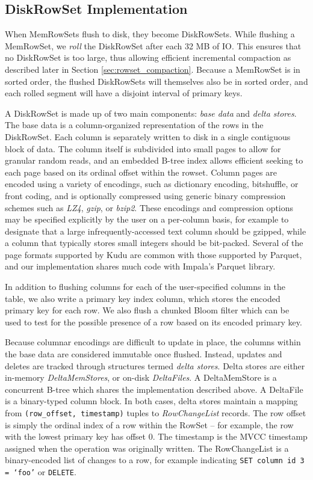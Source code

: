 \documentclass{vldb}
\begin{document}
\subsection{DiskRowSet Implementation}

When MemRowSets flush to disk, they become DiskRowSets. While flushing a
MemRowSet, we {\em roll} the DiskRowSet after each 32 MB of IO. This ensures
that no DiskRowSet is too large, thus allowing efficient incremental compaction
as described later in Section \ref{sec:rowset_compaction}. Because a MemRowSet
is in sorted order, the flushed DiskRowSets will themselves also be in
sorted order, and each rolled segment will have a disjoint interval
of primary keys.

A DiskRowSet is made up of two main components: {\em base data} and {\em delta stores}. The base
data is a column-organized representation of the rows in the DiskRowSet. Each column is separately
written to disk in a single contiguous block of data. The column itself is subdivided into small
pages to allow for granular random reads, and an embedded B-tree index allows efficient seeking to
each page based on its ordinal offset within the rowset. Column pages are encoded using a variety of
encodings, such as dictionary encoding, bitshuffle\cite{bitshuffle}, or front coding, and is optionally
compressed using generic binary compression schemes such as {\em LZ4},
{\em gzip}, or {\em bzip2}. These encodings and compression options may be specified
explicitly by the user on a per-column basis, for example to designate that a large
infrequently-accessed text column should be gzipped, while a column that typically stores small
integers should be bit-packed. Several of the page formats supported by Kudu are common
with those supported by Parquet, and our implementation shares much code with Impala's Parquet
library.

In addition to flushing columns for each of the user-specified columns in the table, we also write a
primary key index column, which stores the encoded primary key for each row.  We also flush a
chunked Bloom filter\cite{bloom_filter} which can be used to test for the possible presence of a row based on its
encoded primary key.

Because columnar encodings are difficult to update in place, the columns within the base data
are considered immutable once flushed. Instead, updates and deletes are tracked through
structures termed {\em delta stores}. Delta stores are either in-memory {\em DeltaMemStores},
or on-disk {\em DeltaFiles}. A DeltaMemStore is a concurrent B-tree which shares the implementation
described above. A DeltaFile is a binary-typed column block. In both cases, delta stores
maintain a mapping from {\tt (row\_offset, timestamp)} tuples to {\em RowChangeList} records.
The row offset is simply the ordinal index of a row within the RowSet -- for example, the row with the
lowest primary key has offset 0. The timestamp is the MVCC timestamp assigned when the operation
was originally written. The RowChangeList is a binary-encoded list of changes to a row, for example
indicating {\tt SET column id 3 = `foo'} or {\tt DELETE}.
\end{document}
